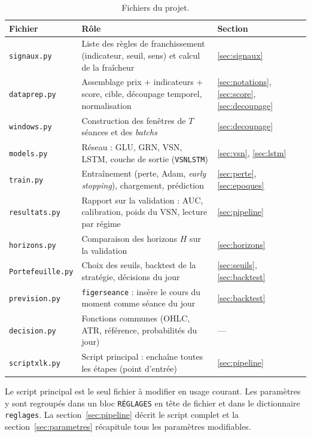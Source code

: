 \documentclass[11pt,a4paper]{article}
\renewcommand{\_}{\usorig\allowbreak}   %
\newcommand{\f}[1]{\texttt{#1}}        %
\begin{document}
\begin{table}[h]
\centering\small
\begin{tabularx}{\linewidth}{@{}l X l@{}}
\toprule
\textbf{Fichier} & \textbf{Rôle} & \textbf{Section} \\
\midrule
\f{signaux.py}      & Liste des règles de franchissement (indicateur, seuil, sens) et calcul de la fraîcheur & \ref{sec:signaux} \\
\f{data\_prep.py}   & Assemblage prix + indicateurs + score, cible, découpage temporel, normalisation & \ref{sec:notations}, \ref{sec:score}, \ref{sec:decoupage} \\
\f{windows.py}      & Construction des fenêtres de $T$ séances et des \emph{batchs} & \ref{sec:decoupage} \\
\f{models.py}       & Réseau : GLU, GRN, VSN, LSTM, couche de sortie (\f{VSNLSTM}) & \ref{sec:vsn}, \ref{sec:lstm} \\
\f{train.py}        & Entraînement (perte, Adam, \emph{early stopping}), chargement, prédiction & \ref{sec:perte}, \ref{sec:epoques} \\
\f{resultats.py}    & Rapport sur la validation : AUC, calibration, poids du VSN, lecture par régime & \ref{sec:pipeline} \\
\f{horizons.py}     & Comparaison des horizons $H$ sur la validation & \ref{sec:horizons} \\
\f{Portefeuille.py} & Choix des seuils, backtest de la stratégie, décisions du jour & \ref{sec:seuils}, \ref{sec:backtest} \\
\f{prevision.py}    & \f{figer\_seance} : insère le cours du moment comme séance du jour & \ref{sec:backtest} \\
\f{decision.py}     & Fonctions communes (OHLC, ATR, référence, probabilités du jour) & --- \\
\f{script\_xlk.py}  & Script principal : enchaîne toutes les étapes (point d'entrée) & \ref{sec:pipeline} \\
\bottomrule
\end{tabularx}
\caption{Fichiers du projet.}
\label{tab:fichiers}
\end{table}

\noindent Le script principal est le seul fichier à modifier en usage courant. Les
paramètres y sont regroupés dans un bloc \f{RÉGLAGES} en tête de fichier et dans le
dictionnaire \f{reglages}. La section~\ref{sec:pipeline} décrit le script complet et la
section~\ref{sec:parametres} récapitule tous les paramètres modifiables.
\end{document}
